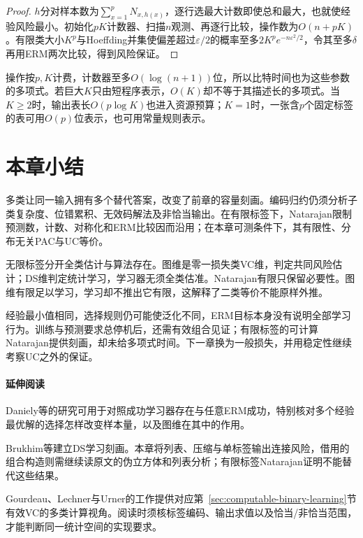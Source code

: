 \begin{proof}
$h$分对样本数为$\sum_{x=1}^pN_{x,h(x)}$，逐行选最大计数即使总和最大，也就使经验风险最小。初始化$pK$计数器、扫描$n$观测、再逐行比较，操作数为$O(n+pK)$。有限类大小$K^p$与Hoeffding并集使偏差超过$\varepsilon/2$的概率至多$2K^pe^{-n\varepsilon^2/2}$，令其至多$\delta$再用ERM两次比较，得到风险保证。
\end{proof}

操作按$p,K$计费，计数器至多$O(\log(n+1))$位，所以比特时间也为这些参数的多项式。若巨大$K$只由短程序表示，$O(K)$却不等于其描述长的多项式。当$K\geq2$时，输出表长$O(p\log K)$也进入资源预算；$K=1$时，一张含$p$个固定标签的表可用$O(p)$位表示，也可用常量规则表示。

\section{本章小结}
\label{sec:multiclass-learning-summary}

多类让同一输入拥有多个替代答案，改变了前章的容量刻画。编码归约仍须分析子类复杂度、位错累积、无效码解法及非恰当输出。在有限标签下，Natarajan限制预测数，计数、对称化和ERM比较因而沿用；在本章可测条件下，其有限性、分布无关PAC与UC等价。

无限标签分开全类估计与算法存在。图维是零一损失类VC维，判定共同风险估计；DS维判定统计学习，学习器无须全类估准。Natarajan有限只保留必要性。图维有限足以学习，学习却不推出它有限，这解释了二类等价不能原样外推。

经验最小值相同，选择规则仍可能使泛化不同，ERM目标本身没有说明全部学习行为。训练与预测要求总停机后，还需有效组合见证；有限标签的可计算Natarajan提供刻画，却未给多项式时间。下一章换为一般损失，并用稳定性继续考察UC之外的保证。

\paragraph{延伸阅读}
Daniely等的研究可用于对照成功学习器存在与任意ERM成功，特别核对多个经验最优解的选择怎样改变样本量，以及图维在其中的作用。

Brukhim等建立DS学习刻画。本章将列表、压缩与单标签输出连接风险，借用的组合构造则需继续读原文的伪立方体和列表分析；有限标签Natarajan证明不能替代这些结果。

Gourdeau、Lechner与Urner的工作提供对应第~\ref{sec:computable-binary-learning}节有效VC的多类计算视角。阅读时须核标签编码、输出求值以及恰当/非恰当范围，才能判断同一统计空间的实现要求。
